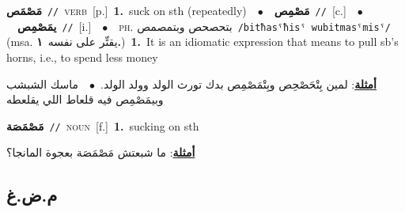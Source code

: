 \documentclass[10pt,a4paper,twoside]{article} %
\begin{document}
\begin{multicols}{2}
{\setlength\topsep{0pt}\textbf{\foreignlanguage{arabic}{مَصْمَص}}\ {\color{gray}\texttt{//}\color{black}}\ \textsc{verb}\ [p.]\ \textbf{1.}~suck on sth (repeatedly)\ \ $\bullet$\ \ \setlength\topsep{0pt}\textbf{\foreignlanguage{arabic}{مَصْمِص}}\ {\color{gray}\texttt{//}\color{black}}\ [c.]\ \ $\bullet$\ \ \setlength\topsep{0pt}\textbf{\foreignlanguage{arabic}{يمَصْمِص}}\ {\color{gray}\texttt{//}\color{black}}\ [i.]\ \ $\bullet$\ \ \textsc{ph.} \color{gray} \foreignlanguage{arabic}{بتحصحص وبتمصمص}\color{black}\ {\color{gray}\texttt{/{\sffamily bitħasˤħisˤ wubitmasˤmisˤ}/}\color{black}}\ \color{gray} (msa. \foreignlanguage{arabic}{يقتِّر على نفسه}~\foreignlanguage{arabic}{\textbf{١.}})\color{black}\ \textbf{1.}~It is an idiomatic expression that means to pull sb's horns, i.e., to spend less money\  \begin{flushright}\color{gray}\foreignlanguage{arabic}{\textbf{\underline{\foreignlanguage{arabic}{أمثلة}}}: لمين بِتْحَصْحِص وبِتْمَصْمِص بدك تورث الولد وولد الولد.\ $\bullet$\ \  ماسك الشبشب وبيمَصْمِص فيه قلعاط اللي يقلعطه}\end{flushright}\color{black}} \vspace{2mm}

{\setlength\topsep{0pt}\textbf{\foreignlanguage{arabic}{مَصْمَصَة}}\ {\color{gray}\texttt{//}\color{black}}\ \textsc{noun}\ [f.]\ \textbf{1.}~sucking on sth\  \begin{flushright}\color{gray}\foreignlanguage{arabic}{\textbf{\underline{\foreignlanguage{arabic}{أمثلة}}}: ما شبعتش مَصْمَصَة بعجوة المانجا؟}\end{flushright}\color{black}} \vspace{2mm}

\vspace{-3mm}
\subsection*{\color{blue}\foreignlanguage{arabic}{م.ض.غ}\color{blue}{}} 


\end{multicols}
\end{document}
